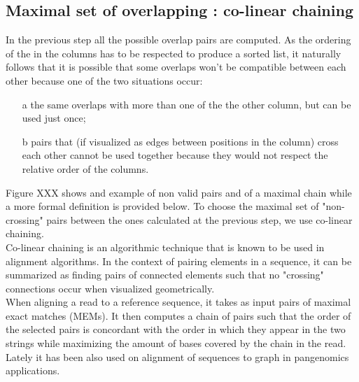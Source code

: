 \subsection{Maximal set of overlapping \kmers: co-linear chaining}
In the previous step all the possible \kmer overlap pairs are computed. As the ordering of the \kmers in the columns has to be respected to produce a sorted list, it naturally follows that it is possible that some overlaps won't be compatible between each other because one of the two situations occur: 
\begin{itemize}
	\item[a] the same \kmer overlaps with more than one \kmer of the the other column, but can be used just once;
	\item[b] pairs that (if visualized as edges between positions in the column) cross each other cannot be used together because they would not respect the relative order of the columns.
\end{itemize}
Figure XXX shows and example of non valid pairs and of a maximal chain while a more formal definition is provided below. To choose the maximal set of "non-crossing" pairs between the ones calculated at the previous step, we use co-linear chaining.\\
Co-linear chaining is an algorithmic technique that is known to be used in alignment algorithms. In the context of pairing elements in a sequence, it can be summarized as finding pairs of connected elements such that no "crossing" connections occur when visualized geometrically. \\
When aligning a read to a reference sequence, it takes as input pairs of maximal exact matches (MEMs). It then computes a chain of pairs such that the order of the selected pairs is concordant with the order in which they appear in the two strings while maximizing the amount of bases covered by the chain in the read. Lately it has been also used on alignment of sequences to graph in pangenomics applications.\\
